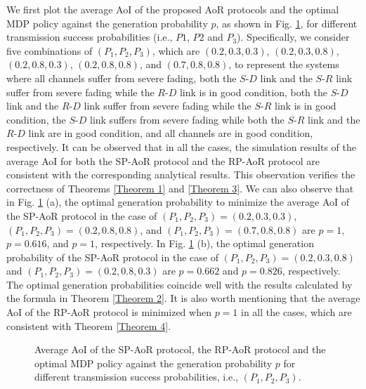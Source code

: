 \documentclass{IEEEtran}
\begin{document}
We first plot the average AoI of the proposed AoR protocols and the optimal MDP policy against the generation probability $p$, as shown in Fig. \ref{simulation_1}, for different transmission success probabilities (i.e., $P1$, $P2$ and $P_3$). Specifically, we consider five combinations of $(P_1,P_2,P_3)$, which are $(0.2,0.3,0.3)$, $(0.2,0.3,0.8)$, $(0.2,0.8,0.3)$, $(0.2,0.8,0.8)$, and $(0.7,0.8,0.8)$, to represent the systems where all channels suffer from severe fading, both the $S$-$D$ link and the $S$-$R$ link suffer from severe fading while the $R$-$D$ link is in good condition, both the $S$-$D$ link and the $R$-$D$ link suffer from severe fading while the $S$-$R$ link is in good condition, the $S$-$D$ link suffers from severe fading while both the $S$-$R$ link and the $R$-$D$ link are in good condition, and all channels are in good condition, respectively. It can be observed that in all the cases, the simulation results of the average AoI for both the SP-AoR protocol and the RP-AoR protocol are consistent with the corresponding analytical results. This observation verifies the correctness of Theorems \ref{Theorem 1} and \ref{Theorem 3}. We can also observe that in Fig. \ref{simulation_1} (a), the optimal generation probability to minimize the average AoI of the SP-AoR protocol in the case of $(P_1,P_2,P_3)=(0.2,0.3,0.3)$, $(P_1,P_2,P_3)=(0.2,0.8,0.8)$, and $(P_1,P_2,P_3)=(0.7,0.8,0.8)$ are $p=1$, $p=0.616$, and $p=1$, respectively. In Fig. \ref{simulation_1} (b), the optimal generation probability of the SP-AoR protocol in the case of $(P_1,P_2,P_3)=(0.2,0.3,0.8)$ and $(P_1,P_2,P_3)=(0.2,0.8,0.3)$ are $p=0.662$ and $p=0.826$, respectively. The optimal generation probabilities coincide well with the results calculated by the formula in Theorem \ref{Theorem 2}. It is also worth mentioning that the average AoI of the RP-AoR protocol is minimized when $p=1$ in all the cases, which are consistent with Theorem \ref{Theorem 4}.

\begin{figure}
	\centering
	\qquad\qquad
	\caption{Average AoI of the SP-AoR protocol, the RP-AoR protocol and the optimal MDP policy against the generation probability $p$ for different transmission success probabilities, i.e., $(P_1, P_2, P_3)$.}
	\label{simulation_1}
	\vspace{-0.5cm}
\end{figure}
\end{document}

